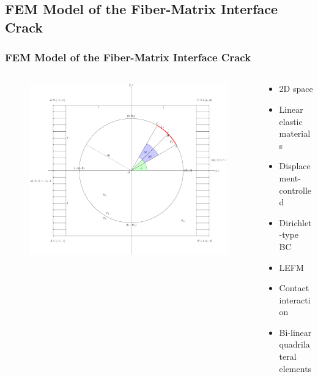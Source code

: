 \documentclass[first,firstsupp,lastsupp,last,hyperref,table]{ETHclass}
\begin{document}
\subsection{FEM Model of the Fiber-Matrix Interface Crack}

\begin{frame}
\frametitle{\small FEM Model of the Fiber-Matrix Interface Crack}
\vspace{-0.5cm}
\centering
\begin{columns}
\begin{column}{0.7\textwidth}
\begin{figure}
\includegraphics[width=\columnwidth]{FEMfiberMatrixInterfaceProblem.pdf}
  \label{fig:jintegral}
\end{figure}
\end{column}
\begin{column}{0.3\textwidth}
\scriptsize
\begin{itemize}[label=]
\item 2D space
\item Linear elastic materials
\item Displacement-controlled
\item Dirichlet-type BC
\item LEFM
\item Contact interaction
\item Bi-linear quadrilateral elements
\end{itemize}
\end{column}
\end{columns}
\end{frame}
\end{document}
